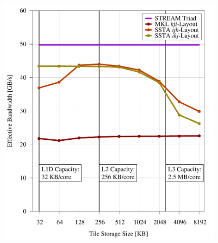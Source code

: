 \documentclass{sig-alternate-05-2015}
\begin{document}
\begin{figure}[!bth]
\begin{minipage}{0.49\textwidth}
{      \includegraphics[width=0.99\columnwidth]{figures/post_tsb_tw_sweep_full_matrix_double_precision_production_edison_ivb_e5_2695_v2_08_31_2016_09_03_2016_12pus.pdf}
      \label{fig:results:tile_size_ivb}
    }
  \end{minipage}
  \begin{minipage}{0.49\textwidth}
\end{minipage}
\end{figure}
\end{document}
